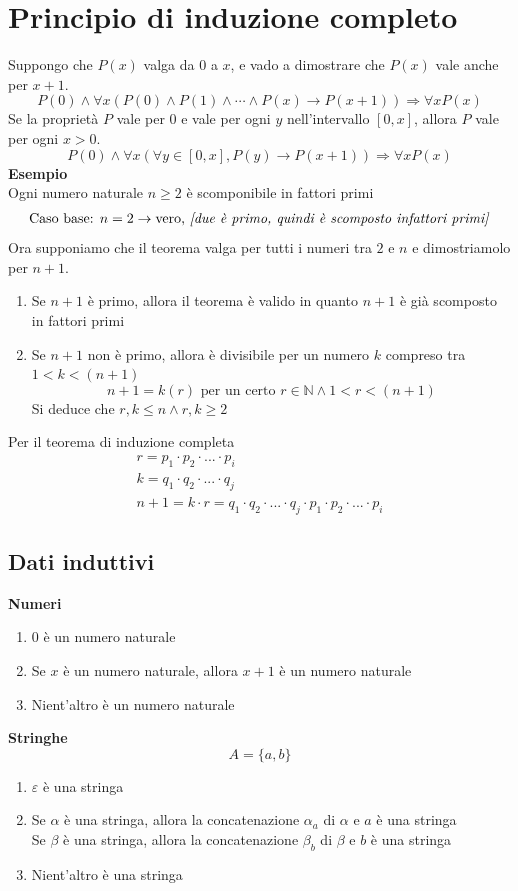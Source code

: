 \documentclass[italian]{article}
\begin{document}
\section{Principio di induzione completo}
Suppongo che $P(x)$ valga da $0$ a $x$, e vado a dimostrare che $P(x)$ vale anche per $x+1$.
\[
	P(0) \land \forall x(P(0) \land P(1) \land \cdots \land P(x) \to P(x+1))\Rightarrow \forall x P(x)
\]
Se la proprietà $P$ vale per $0$ e vale per ogni $y$ nell'intervallo $[0,x]$, allora $P$ vale per ogni $x>0$.
\[
	P(0) \land \forall x (\forall y \in [0,x], P(y) \to P(x+1)) \Rightarrow \forall xP(x)
\]
\textbf{Esempio}\\
Ogni numero naturale $n\geq 2$ è scomponibile in fattori primi
\begin{gather*}
	\text{Caso base: } n=2 \to \text{vero, \textit{[due è primo, quindi è scomposto infattori primi]}} \\
\end{gather*}
Ora supponiamo che il teorema valga per tutti i numeri tra $2$ e $n$ e dimostriamolo per $n+1$.
\begin{enumerate}
	\item Se $n+1$ è primo, allora il teorema è valido in quanto $n+1$ è già scomposto in fattori primi
	\item Se $n+1$ non è primo, allora è divisibile per un numero $k$ compreso tra $1<k<(n+1)$
	\[
		n+1 = k(r) \text{ per un certo } r \in \mathbb{N} \land 1 < r < (n+1)
	\]
	Si deduce che $r, k \leq n \land r,k \geq 2$
\end{enumerate}
Per il teorema di induzione completa
\begin{gather*}
	r = p_1 \cdot p_2 \cdot ... \cdot p_i \\
	k = q_1 \cdot q_2 \cdot ... \cdot q_j \\
	n + 1 = k\cdot r = q_1 \cdot q_2 \cdot ... \cdot q_j \cdot p_1 \cdot p_2 \cdot ... \cdot p_i
\end{gather*}

\pagebreak
\subsection{Dati induttivi}
\textbf{Numeri}
\begin{enumerate}
	\item 0 è un numero naturale
	\item Se $x$ è un numero naturale, allora $x+1$ è un numero naturale
	\item Nient'altro è un numero naturale
\end{enumerate}
\textbf{Stringhe}
\[
	A=\{a,b\}
\]
\begin{enumerate}
	\item $\varepsilon$ è una stringa
	\item Se $\alpha$ è una stringa, allora la concatenazione $\alpha_a$ di $\alpha$ e $a$ è una stringa\\Se $\beta$ è una stringa, allora la concatenazione $\beta_b$ di $\beta$ e $b$ è una stringa
	\item Nient'altro è una stringa
\end{enumerate}
\end{document}
